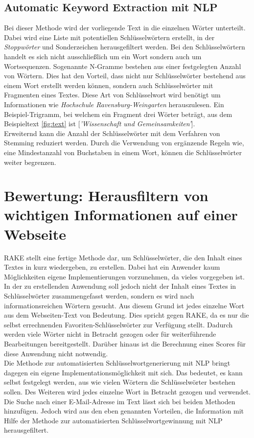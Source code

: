 	\subsection{Automatic Keyword Extraction mit NLP}
	\label{sec:Automatic Keyword Extraction}
	Bei dieser Methode wird der vorliegende Text in die einzelnen Wörter unterteilt. Dabei wird eine Liste mit potentiellen Schlüsselwörtern erstellt, in der \textit{Stoppwörter} und Sonderzeichen herausgefiltert werden. Bei den Schlüsselwörtern handelt es sich nicht ausschließlich um ein Wort sondern auch um Wortsequenzen. Sogenannte N-Gramme bestehen aus einer festgelegten Anzahl von Wörtern. Dies hat den Vorteil, dass nicht nur Schlüsselwörter bestehend aus einem Wort erstellt werden können, sondern auch Schlüsselwörter mit Fragmenten eines Textes. Diese Art von Schlüsselwort wird benötigt um Informationen wie \textit{Hochschule Ravensburg-Weingarten} herauszulesen. Ein Beispiel-Trigramm, bei welchem ein Fragment drei Wörter beträgt, aus dem Beispieltext \ref{fig:text}  ist [\textit{'Wissenschaft und Gemeinsamkeiten'}].\\
	Erweiternd kann die Anzahl der Schlüsselwörter mit dem Verfahren von Stemming reduziert werden. Durch die Verwendung von ergänzende Regeln wie, eine Mindestanzahl von Buchstaben in einem Wort, können die Schlüsselwörter weiter begrenzen.

 

\section{Bewertung: Herausfiltern von wichtigen Informationen auf einer Webseite}
RAKE stellt eine fertige Methode dar, um Schlüsselwörter, die den Inhalt eines Textes in kurz wiedergeben, zu erstellen. Dabei hat ein Anwender kaum Möglichkeiten eigene Implementierungen vorzunehmen, da vieles vorgegeben ist. In der zu erstellenden Anwendung soll jedoch nicht der Inhalt eines Textes in Schlüsselwörter zusammengefasst werden, sondern es wird nach informationsreichen Wörtern gesucht. Aus diesem Grund ist jedes einzelne Wort aus dem Webseiten-Text von Bedeutung. Dies spricht gegen RAKE, da es nur die selbst errechnenden Favoriten-Schlüsselwörter zur Verfügung stellt. Dadurch werden viele Wörter nicht in Betracht gezogen oder für weiterführende Bearbeitungen bereitgestellt. Darüber hinaus ist die Berechnung eines Scores für diese Anwendung nicht notwendig.\\
Die Methode zur automatisierten Schlüsselwortgenerierung mit NLP bringt dagegen ein eigene Implementationsmöglichkeit mit sich. Das bedeutet, es kann selbst festgelegt werden, aus wie vielen Wörtern die Schlüsselwörter bestehen sollen. Des Weiteren wird jedes einzelne Wort in Betracht gezogen und verwendet. Die Suche nach einer E-Mail-Adresse im Text lässt sich bei beiden Methoden hinzufügen. Jedoch wird aus den eben genannten Vorteilen, die Information mit Hilfe der Methode zur automatisierten Schlüsselwortgewinnung mit NLP herausgefiltert.


